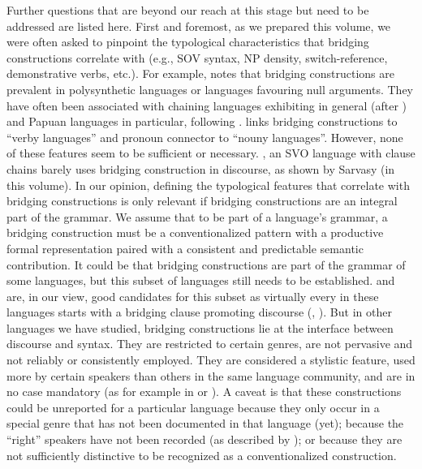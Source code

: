 \documentclass[output=paper]{LSP/langsci}
\begin{document}
Further questions that are beyond our reach at this stage but need to be addressed are listed here. First and foremost, as we prepared this volume, we were often asked to pinpoint the typological characteristics that bridging constructions correlate with (e.g., SOV syntax, NP density, switch-reference, demonstrative verbs, etc.). For example, \citet[][113]{Guillaume2011} notes that bridging constructions are prevalent in polysynthetic languages or languages favouring null arguments. They have often been associated with chaining languages exhibiting  in general (after \citealt{stirling93}) and Papuan languages in particular, following \citealt{devries.2005}. \citet{seifart10} links bridging constructions to ``verby languages'' and pronoun connector to ``nouny languages''.  However, none of these features seem to be sufficient or necessary. , an SVO  language with clause chains barely uses bridging construction in discourse, as shown by Sarvasy (in this volume). In our opinion, defining the typological features that correlate with bridging constructions is only relevant if bridging constructions are an integral part of the grammar. We assume that to be part of a language’s grammar, a bridging construction must be a conventionalized pattern with a productive formal representation paired with a consistent and predictable semantic contribution.  It could be that bridging constructions are part of the grammar of some languages, but this subset of languages still needs to be established.  and  are, in our view, good candidates for this subset as virtually every  in these languages starts with a bridging clause promoting discourse  (\citealt[][152]{kleef88}, \citealt[][589]{overall17}). But in other languages we have studied, bridging constructions lie at the interface between discourse and syntax. They are restricted to certain genres, are not pervasive and not reliably or consistently employed. They are considered a stylistic feature, used more by certain speakers than others in the same language community, and are in no case mandatory (as for example in  or ). A caveat is that these constructions could be unreported for a particular language because they only occur in a special genre that has not been documented in that language (yet); because the ``right'' speakers have not been recorded (as described by \citealt{Grenoble2012}); or because they are not sufficiently distinctive to be recognized as a conventionalized construction.
\end{document}
